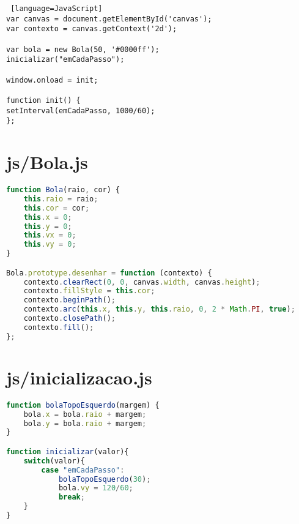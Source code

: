 \documentclass[12pt,a4paper,oneside]{article}
\begin{document}
\begin{lstlisting} [language=JavaScript]
var canvas = document.getElementById('canvas');
var contexto = canvas.getContext('2d');

var bola = new Bola(50, '#0000ff');
inicializar("emCadaPasso");

window.onload = init;

function init() {
setInterval(emCadaPasso, 1000/60);
};
\end{lstlisting}

\newpage

\section*{js/Bola.js}

\begin{lstlisting}[language=JavaScript]
function Bola(raio, cor) {
	this.raio = raio;
	this.cor = cor;
	this.x = 0;
	this.y = 0;
	this.vx = 0;
	this.vy = 0;
}

Bola.prototype.desenhar = function (contexto) {
	contexto.clearRect(0, 0, canvas.width, canvas.height);
	contexto.fillStyle = this.cor;
	contexto.beginPath();
	contexto.arc(this.x, this.y, this.raio, 0, 2 * Math.PI, true);
	contexto.closePath();
	contexto.fill();
};
\end{lstlisting}

\section*{js/inicializacao.js}

\begin{lstlisting}[language=JavaScript]
function bolaTopoEsquerdo(margem) {
	bola.x = bola.raio + margem;
	bola.y = bola.raio + margem;
}

function inicializar(valor){
	switch(valor){
		case "emCadaPasso":
			bolaTopoEsquerdo(30);
			bola.vy = 120/60; 
			break;
	}
}
\end{lstlisting}
\end{document}
